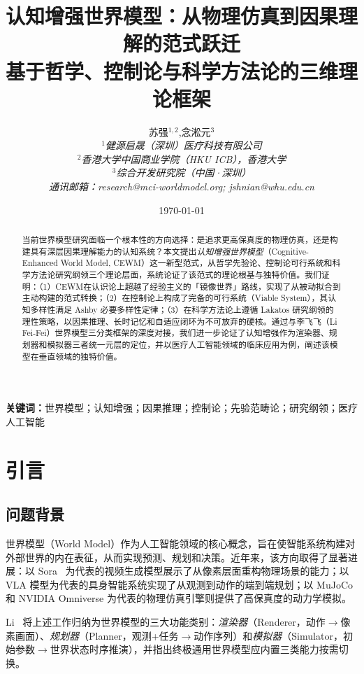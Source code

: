 \documentclass[11pt,a4paper]{article}
\title{%
  \textbf{认知增强世界模型：从物理仿真到因果理解的范式跃迁} \\[6pt]
  {\large 基于哲学、控制论与科学方法论的三维理论框架}
}
\author{%
  苏\quad 强$^{1,2}$,\quad 念淞元$^{3}$ \\[4pt]
  $^{1}$\textit{健源启晟（深圳）医疗科技有限公司} \\
  $^{2}$\textit{香港大学中国商业学院（HKU ICB），香港大学} \\
  $^{3}$\textit{综合开发研究院（中国·深圳）} \\
  \textit{通讯邮箱：research@mci-worldmodel.org; jshnian@whu.edu.cn}
}
\date{\today}
\newcommand{\CEWM}{\textsc{CEWM}}
\begin{document}
\maketitle

\begin{abstract}
当前世界模型研究面临一个根本性的方向选择：是追求更高保真度的物理仿真，还是构建具有深层因果理解能力的认知系统？本文提出\emph{认知增强世界模型}（Cognitive-Enhanced World Model, \CEWM{}）这一新型范式，从哲学先验论、控制论可行系统和科学方法论研究纲领三个理论层面，系统论证了该范式的理论根基与独特价值。我们证明：（1）\CEWM{}在认识论上超越了经验主义的「镜像世界」路线，实现了从被动拟合到主动构建的范式转换；（2）在控制论上构成了完备的可行系统（Viable System），其认知多样性满足 Ashby 必要多样性定律；（3）在科学方法论上遵循 Lakatos 研究纲领的理性策略，以因果推理、长时记忆和自适应闭环为不可放弃的硬核。通过与李飞飞（Li Fei-Fei）世界模型三分类框架的深度对接，我们进一步论证了认知增强作为渲染器、规划器和模拟器三者统一元层的定位，并以医疗人工智能领域的临床应用为例，阐述该模型在垂直领域的独特价值。
\end{abstract}

\noindent\textbf{关键词：}世界模型；认知增强；因果推理；控制论；先验范畴论；研究纲领；医疗人工智能

\section{引言}\label{sec:intro}

\subsection{问题背景}

世界模型（World Model）作为人工智能领域的核心概念，旨在使智能系统构建对外部世界的内在表征，从而实现预测、规划和决策。近年来，该方向取得了显著进展：以 Sora~\citep{openai2024sora} 为代表的视频生成模型展示了从像素层面重构物理场景的能力；以 VLA 模型为代表的具身智能系统实现了从观测到动作的端到端规划；以 MuJoCo~\citep{todorov2012mujoco} 和 NVIDIA Omniverse 为代表的物理仿真引擎则提供了高保真度的动力学模拟。

Li~\citeyearpar{li2024worldmodels} 将上述工作归纳为世界模型的三大功能类别：\emph{渲染器}（Renderer，动作$\to$像素画面）、\emph{规划器}（Planner，观测+任务$\to$动作序列）和\emph{模拟器}（Simulator，初始参数$\to$世界状态时序推演），并指出终极通用世界模型应内置三类能力按需切换。
\end{document}
